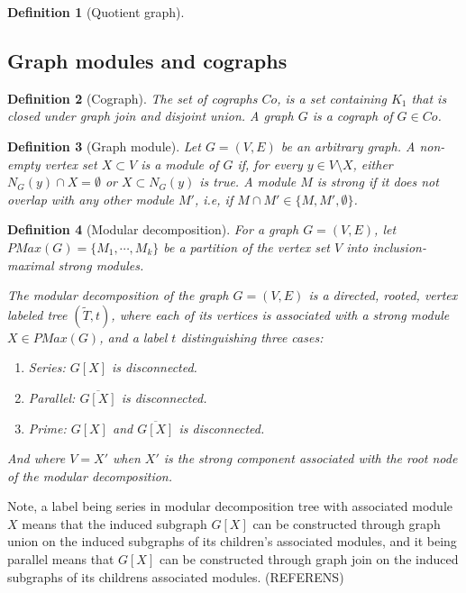 \documentclass{amsart}
\newtheorem{definition}{Definition}[section]
\begin{document}
\begin{definition}[Quotient graph]

\end{definition}

\subsection{Graph modules and cographs}
\label{sec:GraphModules}

\begin{definition}[Cograph]
    The set of cographs $Co$, is a set containing $K_1$ that is closed under 
    graph join and disjoint union. A graph $G$ is a cograph of $G \in Co$.
\end{definition}


\begin{definition}[Graph module]
    Let $G = (V,E)$ be an arbitrary graph. A non-empty vertex set $X \subset V$
    is a module of $G$ if, for every $y \in V \setminus X$,  either
    $N_G(y) \cap X = \emptyset$ or $X \subset N_G(y)$ is true. A module $M$ is
    strong if it does not overlap with any other module $M'$, i.e, if 
    $M \cap M' \in \{M,M',\emptyset \}$.
\end{definition}
   
\begin{definition}[Modular decomposition]
    For a graph $G = (V,E)$, let $PMax(G) = \{M_1,\cdots,M_k\}$ be a partition of the vertex set $V$ 
    into inclusion-maximal strong modules.
    
    The modular decomposition of the graph $G = (V,E)$ is a directed, rooted, vertex labeled tree
    $(\widetilde{T},t)$, where each of its vertices is associated with a strong
    module $X \in PMax(G)$, and a label $t$ distinguishing  three cases:

    \begin{enumerate}
        \item Series: $G[X]$ is disconnected.
        \item Parallel: $\overline{G[X]}$ is disconnected.
        \item Prime: $G[X]$ and $\overline{G[X]}$ is disconnected.
    \end{enumerate}

    And where $V = X'$ when $X'$ is the strong component associated with the
    root node of the modular decomposition.
\end{definition}

Note, a label being series in modular decomposition tree with associated module
$X$ means that the induced subgraph $G[X]$ can be constructed through graph
union on the induced subgraphs of its children's associated modules, and it being
parallel means that $G[X]$ can be constructed through graph join on the
induced subgraphs of its childrens associated modules. (REFERENS)
\end{document}
